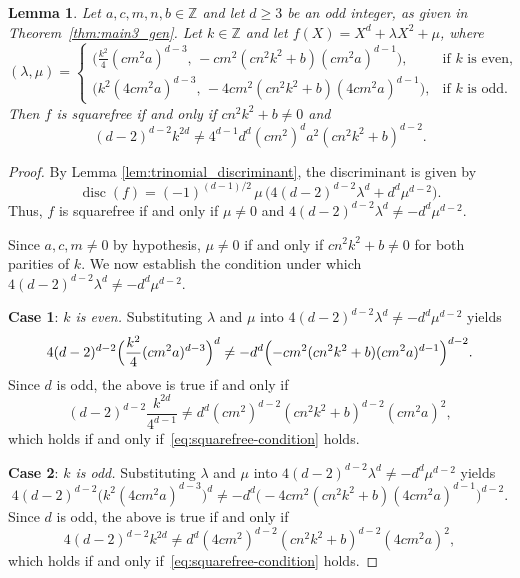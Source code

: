 \documentclass[11pt,a4paper]{amsart}
\newcommand{\ZZ}{\mathbb{Z}}
\theoremstyle{plain}
\newtheorem{lemma}[theorem]{Lemma}
\theoremstyle{definition}
\DeclareMathOperator{\disc}{disc}
\begin{document}
\begin{lemma}\label{lem:squarefree-condition}
Let $a, c, m, n, b \in \ZZ$ and let $d \ge 3$ be an odd integer, as given in Theorem~\ref{thm:main3_gen}. Let $k \in \ZZ$ and let $f(X) = X^d + \lambda X^2 + \mu$, where
\[
(\lambda,\mu) =
\begin{cases}
    \bigl( \frac{k^2}{4}(cm^2a)^{d-3}, \, -cm^2(cn^2k^2+b)(cm^2a)^{d-1} \bigr), & \text{if } k \text{ is even}, \\[1ex]
    \bigl( k^2(4cm^2a)^{d-3}, \, -4cm^2(cn^2k^2+b)(4cm^2a)^{d-1} \bigr), & \text{if } k \text{ is odd}.
\end{cases}
\]
Then $f$ is squarefree if and only if $ cn^2k^2+b \neq 0$ and 
\begin{equation}\label{eq:squarefree-condition}
(d-2)^{d-2} k^{2d} \neq 4^{d-1} d^d (cm^2)^d a^2 (cn^2k^2+b)^{d-2}.
\end{equation}
\end{lemma}
\begin{proof}
By Lemma \ref{lem:trinomial_discriminant}, the discriminant is given by
\begin{equation*}
\disc(f)=(-1)^{(d-1)/2}\,\mu\,\bigl(4(d-2)^{d-2}\lambda^{d}+d^{d}\mu^{d-2}\bigr).
\end{equation*} 
Thus, $f$ is squarefree if and only if $\mu \neq 0$ and $4(d-2)^{d-2}\lambda^{d} \neq -d^{d}\mu^{d-2}$. 

Since $a,c,m\neq 0$ by hypothesis, $\mu \neq 0$ if and only if $ cn^2k^2+b \neq 0$ for both parities of $k$. We now establish the condition under which $4(d-2)^{d-2}\lambda^{d} \neq -d^{d}\mu^{d-2}$.

\medskip
\noindent\textbf{Case 1}: \textit{$k$ is even.}\quad
Substituting $\lambda$ and $\mu$ into $4(d-2)^{d-2}\lambda^{d} \neq -d^{d}\mu^{d-2}$ yields
\[ 4(d-2)^{d-2} \Bigl( \frac{k^2}{4}(cm^2a)^{d-3} \Bigr)^d \neq -d^d \Bigl( -cm^2(cn^2k^2+b)(cm^2a)^{d-1} \Bigr)^{d-2}. \]
Since $d$ is odd, the above is true if and only if
\[ (d-2)^{d-2} \frac{k^{2d}}{4^{d-1}} \neq d^d (cm^2)^{d-2} (cn^2k^2+b)^{d-2} (cm^2a)^2, \]
which holds if and only if~\eqref{eq:squarefree-condition} holds.

\medskip
\noindent\textbf{Case 2}: \textit{$k$ is odd.}\quad
Substituting $\lambda$ and $\mu$ into $4(d-2)^{d-2}\lambda^{d} \neq -d^{d}\mu^{d-2}$ yields
\[ 4(d-2)^{d-2} \bigl( k^2(4cm^2a)^{d-3} \bigr)^d \neq -d^d \bigl( -4cm^2(cn^2k^2+b)(4cm^2a)^{d-1} \bigr)^{d-2}. \]
Since $d$ is odd, the above is true if and only if
\[ 4(d-2)^{d-2} k^{2d} \neq d^d (4cm^2)^{d-2} (cn^2k^2+b)^{d-2} (4cm^2a)^2, \]
which holds if and only if~\eqref{eq:squarefree-condition} holds. 
\end{proof}
\end{document}
